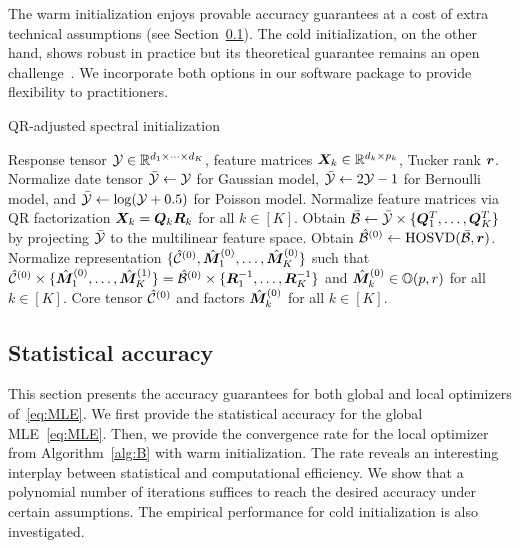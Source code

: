 \documentclass[12pt]{article}
\theoremstyle{definition}
\theoremstyle{definition}
\begin{document}
{\color{blue}The warm initialization enjoys provable accuracy guarantees at a cost of extra technical assumptions (see Section~\ref{subsec:statprob}). The cold initialization, on the other hand, shows robust in practice but its theoretical guarantee remains an open challenge~\citep{luo2021low}. We incorporate both options in our software package to provide flexibility to practitioners.}


\begin{algorithm}[!h]
\caption{QR-adjusted spectral initialization}\label{alg:A}
\begin{algorithmic}[1]
\INPUT Response tensor $\mathcal{Y}\in \mathbb{R}^{d_1\times \cdots \times d_K}$, feature matrices $\bm X_k\in\mathbb{R}^{d_k\times p_k}$, Tucker rank $\bm{r}$. 
\State Normalize date tensor $\bar {\mathcal{Y}}\leftarrow \mathcal{Y}$ for Gaussian model, $\bar {\mathcal{Y}}\leftarrow 2\mathcal{Y}-1$ for Bernoulli model, and $\bar {\mathcal{Y}}\leftarrow \log(\mathcal{Y}+0.5)$ for Poisson model. 
\State Normalize feature matrices via QR factorization $\bm X_k=\bm{Q}_k\bm{R}_k$ for all $k\in[K]$.
\State Obtain $\bar {\mathcal{B}} \leftarrow \bar {\mathcal{Y}}\times\{\bm{Q}^T_1,\ldots,\bm{Q}^T_K\}$ by projecting $\bar {\mathcal{Y}}$ to the multilinear feature space. 
\State Obtain $\hat{\mathcal{B}}^{(0)}\leftarrow \textup{HOSVD}(\bar {\mathcal{B}},\bm{r})$.
\State Normalize representation $\{\hat{\mathcal{C}}^{(0)}, \hat{\bm M}^{(0)}_1,\ldots,\hat{\bm M}^{(0)}_K\}$ such that $\hat{\mathcal{C}}^{(0)}\times\{ \hat{\bm M}^{(0)}_1,\ldots,\hat{\bm M}^{(1)}_K\} = \hat{\mathcal{B}}^{(0)}\times\{ \bm{R}^{-1}_1,\ldots,\bm{R}^{-1}_K\}$ and $\hat{\bm M}^{(0)}_k\in\mathbb{O}(p,r)$ for all $k\in[K]$.
\OUTPUT Core tensor $\hat{\mathcal{C}}^{(0)}$ and factors $\hat{\bm M}^{(0)}_k$ for all $k\in[K]$.
\end{algorithmic}
\end{algorithm}

\subsection{Statistical accuracy}\label{subsec:statprob}
{\color{blue}This section presents the accuracy guarantees for both global and local optimizers of~\eqref{eq:MLE}. We first provide the statistical accuracy for the global MLE~\eqref{eq:MLE}. Then, we provide the convergence rate for the local optimizer from Algorithm~\ref{alg:B} with warm initialization. The rate reveals an interesting interplay between statistical and computational efficiency. We show that a polynomial number of iterations suffices to reach the desired accuracy under certain assumptions.} The empirical performance for cold initialization is also investigated. 
\end{document}
